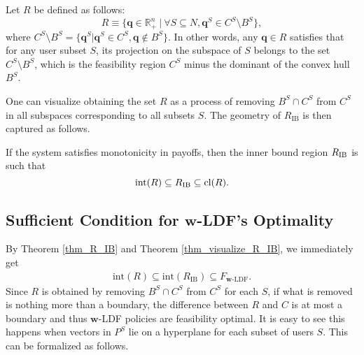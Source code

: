 \documentclass[prodmode,acmtompecs]{acmsmall}
\newcommand{\reqvec}{\mathbf{q}}
\newcommand{\concaveHull}{R}
\newcommand{\feasibilityRegion}{F}
\newcommand{\fullUserSet}{N}
\newcommand{\myComments}[1]{}
\newif\ifinfocom
\newif\ifextended
\newcommand{\infocomStart}{\ifinfocom \myComments{Infocom: }}
\newcommand{\extendedStart}{\ifextended  \myComments{Extended version: }}
\newcommand{\commentEnd}{\myComments{End}}
\begin{document}
\begin{definition}
\label{defn_concave_hull}
Let $\concaveHull$ be defined as follows:
$$
\concaveHull \equiv \{ \reqvec \in \mathbb R^n_+ ~|~  \forall S \subseteq \fullUserSet, \reqvec^S \in  C^S \setminus B^S \},
$$
where $C^S \setminus B^S = \{\reqvec^S|\reqvec^S \in C^S, \reqvec \notin B^S \}$. 
In other words, any $\reqvec \in R$ satisfies that for any user subset $S$, its projection on the subspace of $S$ belongs to the set $C^S \setminus B^S$, which is the feasibility region $C^S$ minus the dominant of the convex hull $B^S$. 
\end{definition}

One can visualize obtaining the set $\concaveHull$ as a process of removing $B^S \cap C^S$ from $C^S$ in all subspaces corresponding to all subsets $S$. The geometry of $R_\text{IB}$ is then captured as follows. 
\begin{theorem}
\label{thm_visualize_R_IB}
If the system satisfies monotonicity in payoffs, then the inner bound region $R_\textnormal{IB}$ is such that
$$
\textnormal{int}(\concaveHull) \subseteq R_\textnormal{IB} \subseteq \textnormal{cl}(\concaveHull). 
$$
\end{theorem}

\infocomStart
See the extended version of this paper \cite{EXT2} for this somewhat technical proof. 
\commentEnd\fi
\extendedStart
\noindent See Appendix \ref{appendix_pf_thm_visualize_R_IB} for this somewhat intricate argument. 
\commentEnd\fi

\subsection{Sufficient Condition for $\mathbf{w}$-LDF's Optimality}

By Theorem \ref{thm_R_IB} and Theorem \ref{thm_visualize_R_IB}, we immediately get
\begin{align}
\label{align_A_vs_R_LDF}
\text{int}(\concaveHull) \subseteq \text{int}(R_\text{IB}) \subseteq \feasibilityRegion_{\mathbf{w}\text{-LDF}}. 
\end{align}
Since $\concaveHull$ is obtained by removing $B^S \cap C^S$ from $C^S$ for each $S$, if what is removed is nothing more than a boundary, the difference between $\concaveHull$ and $C$ is at most a boundary and thus $\mathbf{w}$-LDF policies are feasibility optimal. It is easy to see this happens when vectors in $P^S$ lie on a hyperplane for each subset of users $S$. This can be formalized as follows. 
\end{document}
